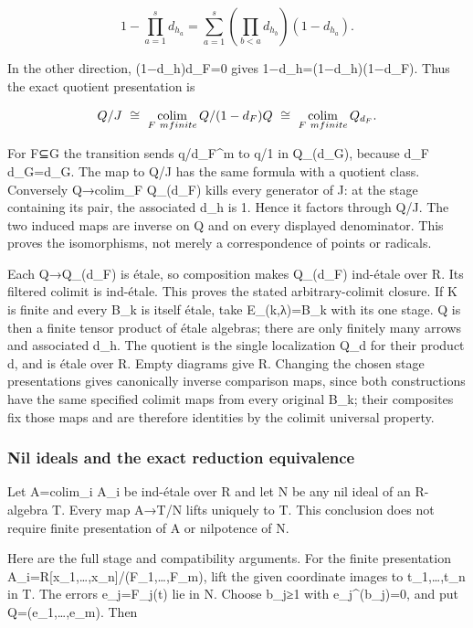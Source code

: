 \[
1-\prod_{a=1}^s d_{h_a}
 =\sum_{a=1}^s\left(\prod_{b<a}d_{h_b}\right)(1-d_{h_a}).
\]

In the other direction, (1−d\_h)d\_F=0 gives 1−d\_h=(1−d\_h)(1−d\_F). Thus the exact quotient presentation is

\[
Q/J\ \cong\ \mathop{\rm colim}_{F\ {m finite}}
     Q/(1-d_F)Q
\ \cong\ \mathop{\rm colim}_{F\ {m finite}} Q_{d_F}.
\]

For F⊆G the transition sends q/d\_F\^{}m to q/1 in Q\_(d\_G), because d\_F d\_G=d\_G. The map to Q/J has the same formula with a quotient class. Conversely Q→colim\_F Q\_(d\_F) kills every generator of J: at the stage containing its pair, the associated d\_h is 1. Hence it factors through Q/J. The two induced maps are inverse on Q and on every displayed denominator. This proves the isomorphisms, not merely a correspondence of points or radicals.

Each Q→Q\_(d\_F) is étale, so composition makes Q\_(d\_F) ind-étale over R. Its filtered colimit is ind-étale. This proves the stated arbitrary-colimit closure. If K is finite and every B\_k is itself étale, take E\_(k,λ)=B\_k with its one stage. Q is then a finite tensor product of étale algebras; there are only finitely many arrows and associated d\_h. The quotient is the single localization Q\_d for their product d, and is étale over R. Empty diagrams give R. Changing the chosen stage presentations gives canonically inverse comparison maps, since both constructions have the same specified colimit maps from every original B\_k; their composites fix those maps and are therefore identities by the colimit universal property.

\subsubsection{Nil ideals and the exact reduction equivalence}\label{nil-ideals-and-the-exact-reduction-equivalence}

Let A=colim\_i A\_i be ind-étale over R and let N be any nil ideal of an R-algebra T. Every map A→T/N lifts uniquely to T. This conclusion does not require finite presentation of A or nilpotence of N.

Here are the full stage and compatibility arguments. For the finite presentation A\_i=R{[}x\_1,\ldots,x\_n{]}/(F\_1,\ldots,F\_m), lift the given coordinate images to t\_1,\ldots,t\_n in T. The errors e\_j=F\_j(t) lie in N. Choose b\_j≥1 with e\_j\^{}(b\_j)=0, and put Q=(e\_1,\ldots,e\_m). Then

